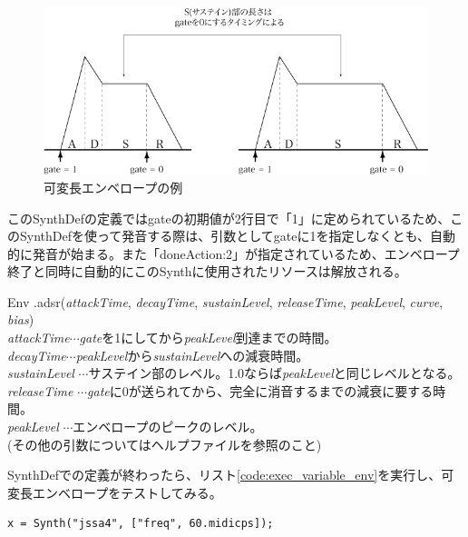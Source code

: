\documentclass{jsarticle}
\begin{document}
\begin{figure}[htbp]
  \begin{center}
    \includegraphics[scale=0.7]{adsr_env.pdf}
  \end{center}
  \caption{可変長エンベロープの例}
  \label{fig:env}
\end{figure}

このSynthDefの定義ではgateの初期値が2行目で「1」に定められているため、このSynthDefを使って発音する際は、引数としてgateに1を指定しなくとも、自動的に発音が始まる。また「doneAction:2」が指定されているため、エンベロープ終了と同時に自動的にこのSynthに使用されたリソースは解放される。

\begin{itembox}[l]{Env}
{\footnotesize 
.adsr({\it attackTime}, {\it decayTime}, {\it sustainLevel}, {\it releaseTime}, {\it peakLevel}, {\it curve}, {\it bias})\\

{\it attackTime}$\cdots${\it gate}を1にしてから{\it peakLevel}到達までの時間。\\
{\it decayTime}$\cdots${\it peakLevel}から{\it sustainLevel}への減衰時間。\\
{\it sustainLevel} $\cdots$サステイン部のレベル。1.0ならば{\it peakLevel}と同じレベルとなる。\\
{\it releaseTime} $\cdots${\it gate}に0が送られてから、完全に消音するまでの減衰に要する時間。\\
{\it peakLevel} $\cdots$エンベロープのピークのレベル。\\
(その他の引数についてはヘルプファイルを参照のこと)
}
\end{itembox}

SynthDefでの定義が終わったら、リスト\ref{code:exec_variable_env}を実行し、可変長エンベロープをテストしてみる。

\begin{lstlisting}[caption=可変長エンベロープのSynthの実行,label=code:exec_variable_env]
x = Synth("jssa4", ["freq", 60.midicps]);
\end{lstlisting}
\end{document}
